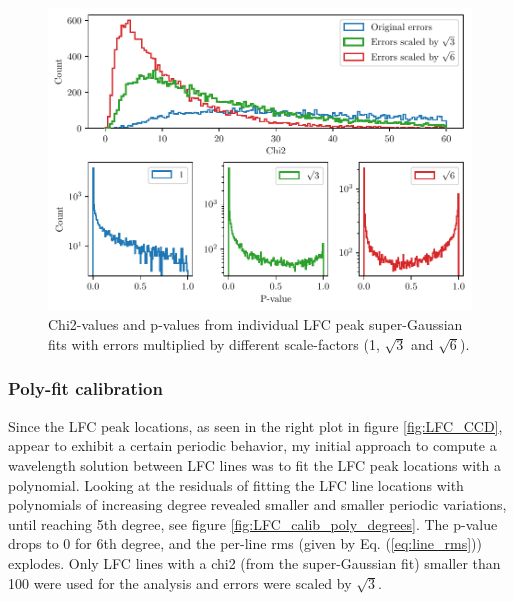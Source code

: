     \begin{figure}%
        \begin{wide}  
            \includegraphics[width=\textwidth]{figures/calib/calib_errors2.pdf}
            \caption{Chi2-values and p-values from individual LFC peak super-Gaussian fits with errors multiplied by different scale-factors (1, $\sqrt{3}$ and $\sqrt{6}$).}
        \label{fig:calib_errors}
        \end{wide}
    \end{figure}

    \subsubsection{Poly-fit calibration}
    Since the LFC peak locations, as seen in the right plot in figure \ref{fig:LFC_CCD}, appear to exhibit a certain periodic behavior, my initial approach to compute a wavelength solution between LFC lines was to fit the LFC peak locations with a polynomial. Looking at the residuals of fitting the LFC line locations with polynomials of increasing degree revealed smaller and smaller periodic variations, until reaching 5th degree, see figure \ref{fig:LFC_calib_poly_degrees}. The p-value drops to 0 for 6th degree, and the per-line rms (given by Eq. (\ref{eq:line_rms})) explodes. Only LFC lines with a chi2 (from the super-Gaussian fit) smaller than 100 were used for the analysis and errors were scaled by $\sqrt{3}$.

